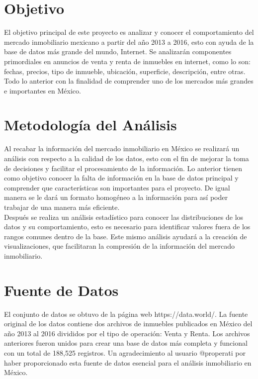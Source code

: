 \documentclass{report}
\begin{document}
    
\section{Objetivo}
El objetivo principal de este proyecto es analizar y conocer el comportamiento del mercado inmobiliario mexicano a partir del año 2013 a 2016, esto con ayuda de la base de datos más grande del mundo, Internet. Se analizarán componentes primordiales en anuncios de venta y renta de inmuebles en internet, como lo son: fechas, precios, tipo de inmueble, ubicación, superficie, descripción, entre otras. Todo lo anterior con la finalidad de comprender uno de los mercados más grandes e importantes en México.
    
\section{Metodología del Análisis}
Al recabar la información del mercado inmobiliario en México se realizará un análisis con respecto a la calidad de los datos, esto con el fin de mejorar la toma de decisiones y facilitar el procesamiento de la información. Lo anterior tienen como objetivo conocer la falta de información en la base de datos principal y comprender que características son importantes para el proyecto. De igual manera se le dará un formato homogéneo a la información para así poder trabajar de una manera más eficiente. \\
	
Después se realiza un análisis estadístico para conocer las distribuciones de los datos y su comportamiento, esto es necesario para identificar valores fuera de los rangos comunes dentro de la base. Este mismo análisis ayudará a la creación de visualizaciones, que facilitaran la compresión de la información del mercado inmobiliario.
	
\section{Fuente de Datos}
El conjunto de datos se obtuvo de la página web https://data.world/. La fuente original de los datos contiene dos archivos de inmuebles publicados en México del año 2013 al 2016 divididos por el tipo de operación: Venta y Renta. Los archivos anteriores fueron unidos para crear una base de datos más completa y funcional con un total de 188,525 registros. Un agradecimiento al usuario @properati por haber proporcionado esta fuente de datos esencial para el análisis inmobiliario en México.
	
\end{document}
